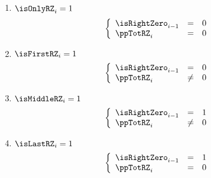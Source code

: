 \begin{enumerate}[resume]
   \item \If $\isOnlyRZ      _{i} = 1$ \Then
	\[
	    \left\{ \begin{array}{lcl}
		\isRightZero_{i - 1}  & = & 0 \\
		\ppTotRZ_{i    }      & = & 0 \\
	    \end{array} \right.
	\]
    \item \If $\isFirstRZ     _{i} = 1$ \Then
	\[
	    \left\{ \begin{array}{lclr}
		\isRightZero_{i - 1}  & =    & 0 \\
		\ppTotRZ_{i    }      & \neq & 0 \\
	    \end{array} \right.
	\]
    \item \If $\isMiddleRZ    _{i} = 1$ \Then
	\[
	    \left\{ \begin{array}{lcl}
		\isRightZero_{i - 1}   & =    & 1 \\
		\ppTotRZ    _{i    }  & \neq & 0  \\
	    \end{array} \right.
	\]
    \item \If $\isLastRZ      _{i} = 1$ \Then
	\[
	    \left\{ \begin{array}{lcl}
		\isRightZero_{i - 1} & = & 1 \\
		\ppTotRZ    _{i    } & = & 0 \\
	    \end{array} \right.
	\]
\end{enumerate}
